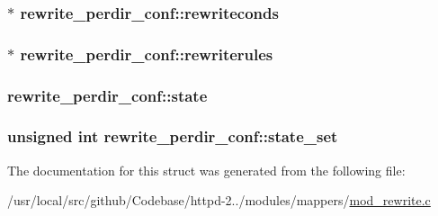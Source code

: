 \subsubsection[{\texorpdfstring{rewriteconds}{rewriteconds}}]{$\ast$ rewrite\+\_\+perdir\+\_\+conf\+::rewriteconds}\hypertarget{structrewrite__perdir__conf_aeb07780a77f9247a698f5d5168cd83d6}{}\label{structrewrite__perdir__conf_aeb07780a77f9247a698f5d5168cd83d6}
\subsubsection[{\texorpdfstring{rewriterules}{rewriterules}}]{$\ast$ rewrite\+\_\+perdir\+\_\+conf\+::rewriterules}\hypertarget{structrewrite__perdir__conf_ade3b47b0ad02b91b5b23e3c2af433b56}{}\label{structrewrite__perdir__conf_ade3b47b0ad02b91b5b23e3c2af433b56}
\subsubsection[{\texorpdfstring{state}{state}}]{ rewrite\+\_\+perdir\+\_\+conf\+::state}\hypertarget{structrewrite__perdir__conf_ada92565d48c2a643e08ad1b52ae33ec0}{}\label{structrewrite__perdir__conf_ada92565d48c2a643e08ad1b52ae33ec0}
\subsubsection[{\texorpdfstring{state\+\_\+set}{state_set}}]{\setlength{\rightskip}{0pt plus 5cm}unsigned {\bf int} rewrite\+\_\+perdir\+\_\+conf\+::state\+\_\+set}\hypertarget{structrewrite__perdir__conf_a6b68647d252e55c7b21dd0920407cf2d}{}\label{structrewrite__perdir__conf_a6b68647d252e55c7b21dd0920407cf2d}


The documentation for this struct was generated from the following file\+:\begin{DoxyCompactItemize}
\item 
/usr/local/src/github/\+Codebase/httpd-\/2../modules/mappers/\hyperlink{mod__rewrite_8c}{mod\+\_\+rewrite.\+c}\end{DoxyCompactItemize}
